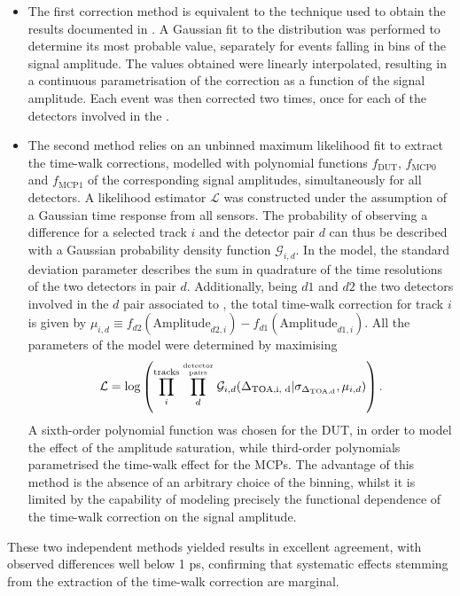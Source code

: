 		\begin{itemize}
			\item The first correction method is equivalent to the technique used to obtain the results documented in \cite{ATTRACT_proto1_testbeam}. A Gaussian fit to the \dtoa distribution was performed to determine its most probable value, separately for events falling in bins of the signal amplitude. The values obtained were linearly interpolated, resulting in a continuous parametrisation of the correction as a function of the signal amplitude. Each event was then corrected two times, once for each of the detectors involved in the \dtoa. 

			\item The second method relies on an unbinned maximum likelihood fit to extract the time-walk corrections, modelled with polynomial functions $f_\text{DUT}$, $f_\text{MCP0}$ and $f_\text{MCP1}$ of the corresponding signal amplitudes, simultaneously for all detectors. A likelihood estimator $\mathcal{L}$ was constructed under the assumption of a Gaussian time response from all sensors. The probability of observing a \dtoaid difference for a selected track $i$ and the detector pair $d$ can thus be described with a Gaussian probability density function $\mathcal{G}_{i,d}$. In the model, the standard deviation parameter \sigdtoad describes the sum in quadrature of the time resolutions of the two detectors in pair $d$. Additionally, being $d1$ and $d2$ the two detectors involved in the $d$ pair associated to \dtoaid, the total time-walk correction for track $i$ is given by $\mu_{i,d}\equiv f_{d2}(\mathrm{Amplitude}_{d2,i})-f_{d1}(\mathrm{Amplitude}_{d1,i})$. All the parameters of the model were determined by maximising
				\begin{equation}
					\mathcal{L}=\log\left(\prod_i^{\text{tracks}} \prod_d^{\text{detector}\atop\text{pairs}} \mathcal{G}_{i,d}( \Delta_{\text{TOA,i, d}}|\sigma_{\Delta_{\text{TOA,d}}},\mu_{i,d})\right).
				\end{equation}
				A sixth-order polynomial function was chosen for the DUT, in order to model the effect of the amplitude saturation, while third-order polynomials parametrised the time-walk effect for the MCPs. The advantage of this method is the absence of an arbitrary choice of the binning, whilst it is limited by the capability of modeling precisely the functional dependence of the time-walk correction on the signal amplitude.
		\end{itemize}

		These two independent methods yielded results in excellent agreement, with observed differences well below 1 ps, confirming that systematic effects stemming from the extraction of the time-walk correction are marginal.

